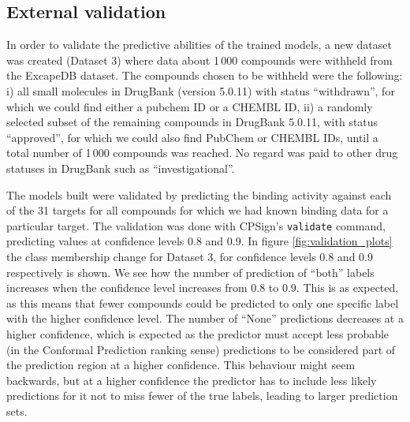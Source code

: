 \documentclass[utf8]{frontiersSCNS} %
\newcommand{\inlinetodo}[1]{{\color{magenta}\oldtodo[inline]{\color{white}\textsf{#1}}}}
\begin{document}
%
%

\subsection{External validation}

In order to validate the predictive abilities of the trained models, a new
dataset was created (Dataset 3) where data about 1\,000 compounds were withheld
from the ExcapeDB dataset. The compounds chosen to be withheld were the
following: i) all small molecules in DrugBank (version 5.0.11) with status
``withdrawn'', for which we could find either a pubchem ID or a CHEMBL ID, ii)
a randomly selected subset of the remaining compounds in DrugBank 5.0.11, with
status ``approved'', for which we could also find PubChem or CHEMBL IDs, until
a total number of 1\,000 compounds was reached.  No regard was paid to other
drug statuses in DrugBank such as ``investigational''.

The models built were validated by predicting the binding activity against each
of the 31 targets for all compounds for which we had known binding data for a
particular target. The validation was done with CPSign's \texttt{validate}
command, predicting values at confidence levels 0.8 and 0.9.
%
In figure \ref{fig:validation_plots} the class membership change for Dataset 3,
for confidence levels 0.8 and 0.9 respectively is shown. We see how the number
of prediction of ``both'' labels increases when the confidence level increases
from 0.8 to 0.9. This is as expected, as this means that fewer compounds could
be predicted to only one specific label with the higher confidence level. The number of
``None'' predictions decreases at a higher confidence, which is expected as the
predictor must accept less probable (in the Conformal Prediction ranking sense)
predictions to be considered part of the prediction region at a higher confidence.
This behaviour might seem backwards, but at a higher confidence the predictor
has to include less likely predictions for it not to miss fewer of the true labels, leading
to larger prediction sets.
\end{document}
